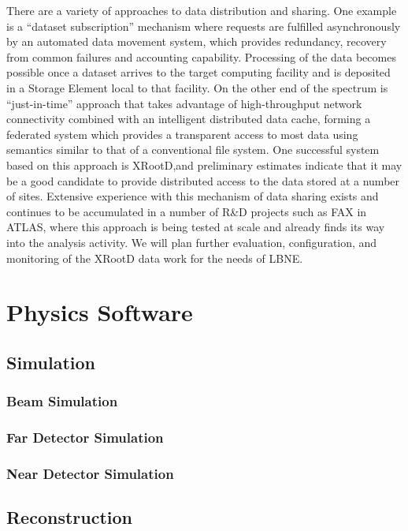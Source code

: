 There are a variety of approaches to data distribution and sharing. One example is a ``dataset subscription''  mechanism where requests are fulfilled asynchronously by an automated data movement system, which provides redundancy, recovery from common failures and accounting capability. Processing of the data becomes possible once a dataset arrives to the target computing facility and is deposited in a Storage Element local to that facility.
On the other end of the spectrum is ``just-in-time'' approach that takes advantage of high-throughput network connectivity combined with an intelligent distributed data cache, forming a federated system which provides a 
transparent access to most data using semantics similar to that of a conventional file system. One successful system based on this approach is XRootD,and preliminary estimates indicate that it may be a good candidate to provide distributed access to the data stored at a number of sites. Extensive experience with this mechanism of data sharing exists and continues to be accumulated in a number of R\&D projects such as FAX in ATLAS, where this approach is being tested at scale and already finds its way into the analysis activity. We will plan further evaluation, configuration, and monitoring of the XRootD data work for the needs of LBNE.

\section{Physics Software}
\label{sec:detectors-sc-physics-software}

\subsection{Simulation}
\label{sec:detectors-sc-physics-software-simulation}

\subsubsection{Beam Simulation}
\label{sec:detectors-sc-physics-software-simulation-beam}

\subsubsection{Far Detector Simulation}
\label{sec:detectors-sc-physics-software-simulation-fd}


\subsubsection{Near Detector Simulation}
\label{sec:detectors-sc-physics-software-simulation-nd}
 


\subsection{Reconstruction}
\label{sec:detectors-sc-physics-software-reco}



